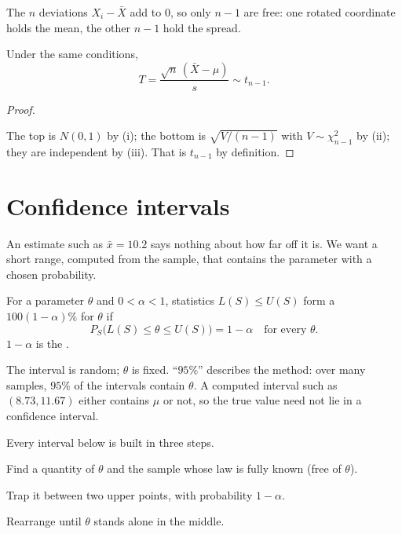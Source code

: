The $n$ deviations $X_i-\bar X$ add to $0$, so only $n-1$ are free: one rotated coordinate holds the mean, the other $n-1$ hold the spread.

\begin{corollary}
Under the same conditions,
\[
  \boxed{\;T=\frac{\sqrt n\,(\bar X-\mu)}{s}\sim t_{n-1}.\;}
\]
\end{corollary}
\begin{proof}
\begin{deriv}
\end{deriv}
The top is $N(0,1)$ by (i); the bottom is $\sqrt{V/(n-1)}$ with $V\sim\chi^2_{n-1}$ by (ii); they are independent by (iii). That is $t_{n-1}$ by definition.
\end{proof}

\section{Confidence intervals}

An estimate such as $\bar x=10.2$ says nothing about how far off it is. We want a short range, computed from the sample, that contains the parameter with a chosen probability.

\begin{definition}
For a parameter $\theta$ and $0<\alpha<1$, statistics $L(S)\le U(S)$ form a $100(1-\alpha)\%$  for $\theta$ if
\[
  \boxed{\;P_S\big(L(S)\le\theta\le U(S)\big)=1-\alpha\quad\text{for every }\theta.\;}
\]
$1-\alpha$ is the .
\end{definition}

The interval is random; $\theta$ is fixed. ``$95\%$'' describes the method: over many samples, $95\%$ of the intervals contain $\theta$. A computed interval such as $(8.73,11.67)$ either contains $\mu$ or not, so the true value need not lie in a confidence interval.

\begin{setup}
Every interval below is built in three steps.
\begin{steps}
  \item Find a quantity of $\theta$ and the sample whose law is fully known (free of $\theta$).
  \item Trap it between two upper points, with probability $1-\alpha$.
  \item Rearrange until $\theta$ stands alone in the middle.
\end{steps}
\end{setup}

